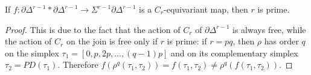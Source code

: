 \begin{lemma}
    If $f\colon \partial \Delta^{r-1}*\partial\Delta^{r-1}\to \Sigma^{r-1}\partial \Delta^{r-1}$ is a $C_r$-equivariant map, then $r$ is prime.
\end{lemma}
\begin{proof}
    This is due to the fact that the action of $C_r$ of $\partial \Delta^{r-1}$ is always free, while the action of $C_r$ on the join is free only if $r$ is prime: if $r=pq$, then $\rho$ has order $q$ on the simplex $\tau_1 = [0,p,2p,\ldots,(q-1)p]$ and on its complementary simplex $\tau_2 = PD(\tau_1)$. Therefore $f(\rho^q(\tau_1,\tau_2)) = f(\tau_1,\tau_2)\neq \rho^q(f(\tau_1,\tau_2))$.
\end{proof}
